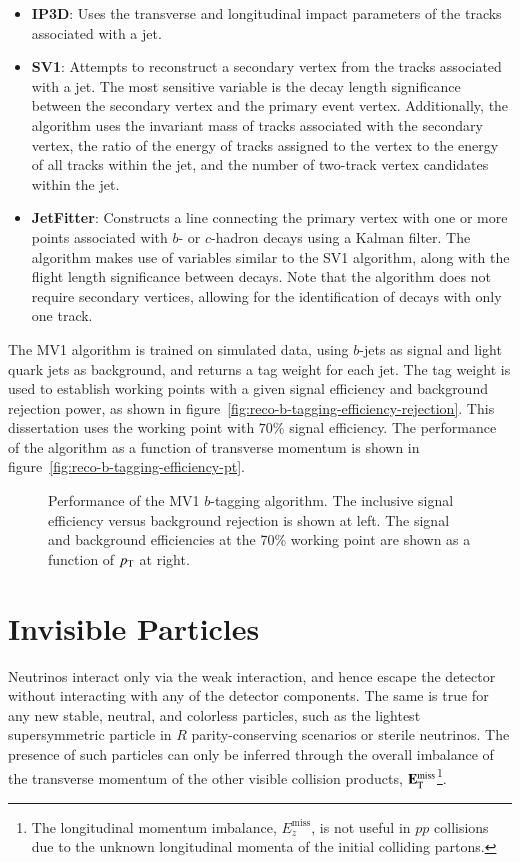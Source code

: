 \begin{itemize}
	\item \textbf{IP3D}: Uses the transverse and longitudinal impact parameters of the tracks associated with a jet.
	\item \textbf{SV1}: Attempts to reconstruct a secondary vertex from the tracks associated with a jet. The most sensitive variable is the decay length significance between the secondary vertex and the primary event vertex. Additionally, the algorithm uses the invariant mass of tracks associated with the secondary vertex, the ratio of the energy of tracks assigned to the vertex to the energy of all tracks within the jet, and the number of two-track vertex candidates within the jet. 
	\item \textbf{JetFitter}: Constructs a line connecting the primary vertex with one or more points associated with $b$- or $c$-hadron decays using a Kalman filter. The algorithm makes use of variables similar to the SV1 algorithm, along with the flight length significance between decays. Note that the algorithm does not require secondary vertices, allowing for the identification of decays with only one track. 
\end{itemize}

The MV1 algorithm is trained on simulated data, using $b$-jets as signal and light quark jets as background, and returns a tag weight for each jet. The tag weight is used to establish working points with a given signal efficiency and background rejection power, as shown in figure~\ref{fig:reco-b-tagging-efficiency-rejection}. This dissertation uses the working point with $70\%$ signal efficiency. The performance of the algorithm as a function of transverse momentum is shown in figure~\ref{fig:reco-b-tagging-efficiency-pt}.

\begin{figure}[htbp]
	\centering
	\hfill
	\caption{Performance of the MV1 $b$-tagging algorithm. The inclusive signal efficiency versus background rejection is shown at left. The signal and background efficiencies at the 70\% working point are shown as a function of $p_{\text{T}}$ at right.}
	\label{fig:reco-b-tagging-efficiency}
\end{figure}


\section{Invisible Particles}\label{sec:reco-met}
Neutrinos interact only via the weak interaction, and hence escape the detector without interacting with any of the detector components. The same is true for any new stable, neutral, and colorless particles, such as the lightest supersymmetric particle in $R$ parity-conserving scenarios or sterile neutrinos. The presence of such particles can only be inferred through the overall imbalance of the transverse momentum of the other visible collision products, $\mathbf{E}_{\mathrm{T}}^{\mathrm{miss}}$\footnote{The longitudinal momentum imbalance, $E_{z}^{\mathrm{miss}}$, is not useful in $pp$ collisions due to the unknown longitudinal momenta of the initial colliding partons.}. 

